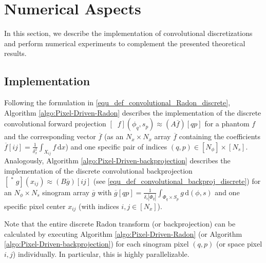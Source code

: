 \documentclass[11pt,reqno]{amsart}
\DeclareMathOperator{\GenRadon}{\mathcal{R}^\omega_{\delta}}
\newcommand{\dd}[1]{\,\mathrm{d}{#1}}
\numberwithin{theorem}{section}
\theoremstyle{remark}
\begin{document}
\section{Numerical Aspects}
\label{section_numerics}

In this section, we describe the implementation of convolutional discretizations and perform numerical experiments to complement the presented theoretical results.  


\subsection{Implementation}
Following the formulation in \eqref{equ_def_convolutional_Radon_discrete}, Algorithm \ref{algo:Pixel-Driven-Radon} describes the implementation of the discrete convolutional forward projection $[\GenRadon f](\phi_q,s_p) \approx (A \overline f)[qp]$ for a phantom $f$ and the corresponding vector $\overline f$ (as an $N_x\times N_x$ array $\overline f$ containing the coefficients $\overline f [ij]=\frac{1}{\delta_x^2}\int_{X_{ij}} f \dd x$) and one specific pair of indices $(q,p) \in [N_\phi]\times [N_s]$. 
Analogously, Algorithm \ref{algo:Pixel-Driven-backprojection} describes the implementation of the discrete convolutional backprojection $[\GenRadon^* g] (x_{ij}) \approx (B \overline g)[ij]$ (see \eqref{equ_def_convolutional_backproj_discrete}) for an $N_\phi\times N_s$ sinogram array $\overline g$ with $\overline g[qp]= \frac{1}{\delta_s|\Phi_q|} \int_{\Phi_q\times S_p} g \dd{(\phi,s)}$ and one specific pixel center $x_{ij}$ (with indices $i,j\in [N_x]$).

Note that the entire discrete Radon transform (or backprojection) can be calculated by executing Algorithm \ref{algo:Pixel-Driven-Radon} (or Algorithm \ref{algo:Pixel-Driven-backprojection}) for each sinogram pixel $(q,p)$ (or space pixel $i,j$) individually. In particular, this is highly parallelizable.
\end{document}
